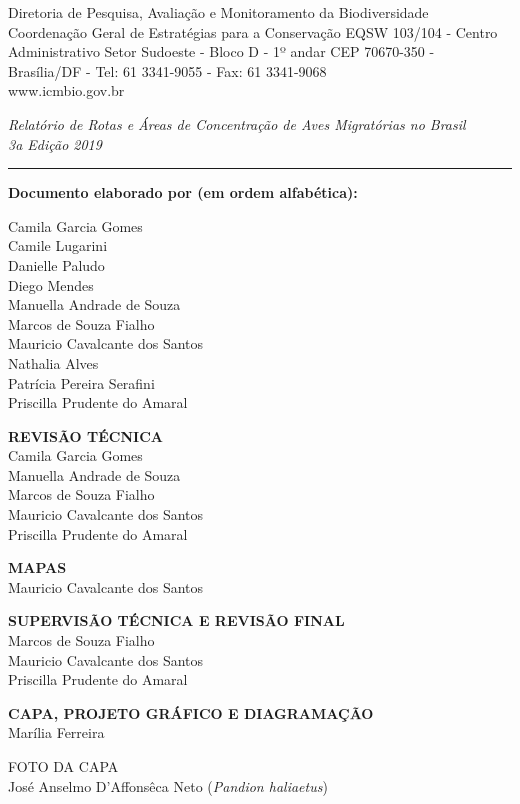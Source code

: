 \documentclass[
  oneside]{scrbook}
\begin{document}
Diretoria de Pesquisa, Avaliação e Monitoramento da Biodiversidade\\
Coordenação Geral de Estratégias para a Conservação EQSW 103/104 - Centro Administrativo Setor Sudoeste - Bloco D - 1º andar CEP 70670-350 - Brasília/DF - Tel: 61 3341-9055 - Fax: 61 3341-9068\\
www.icmbio.gov.br

\emph{Relatório de Rotas e Áreas de Concentração de Aves Migratórias no Brasil}\\
\emph{3a Edição \textbar{} 2019}

\begin{center}\rule{0.5\linewidth}{0.5pt}\end{center}

\textbf{Documento elaborado por (em ordem alfabética):}

Camila Garcia Gomes\\
Camile Lugarini\\
Danielle Paludo\\
Diego Mendes\\
Manuella Andrade de Souza\\
Marcos de Souza Fialho\\
Mauricio Cavalcante dos Santos\\
Nathalia Alves\\
Patrícia Pereira Serafini\\
Priscilla Prudente do Amaral

\textbf{REVISÃO TÉCNICA}\\
Camila Garcia Gomes\\
Manuella Andrade de Souza\\
Marcos de Souza Fialho\\
Mauricio Cavalcante dos Santos\\
Priscilla Prudente do Amaral

\textbf{MAPAS}\\
Mauricio Cavalcante dos Santos

\textbf{SUPERVISÃO TÉCNICA E REVISÃO FINAL}\\
Marcos de Souza Fialho\\
Mauricio Cavalcante dos Santos\\
Priscilla Prudente do Amaral

\textbf{CAPA, PROJETO GRÁFICO E DIAGRAMAÇÃO}\\
Marília Ferreira

FOTO DA CAPA\\
José Anselmo D'Affonsêca Neto (\emph{Pandion haliaetus})
\end{document}
